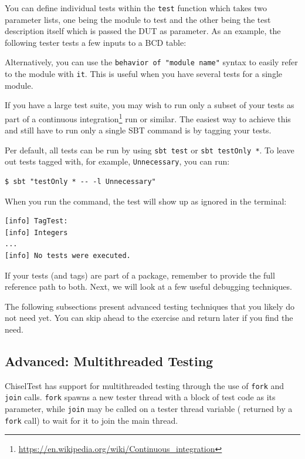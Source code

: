 \documentclass[%
    10pt,
    headinclude, footexclude,
    openright, %
    notitlepage,
    cleardoubleempty,
    headsepline,
    pointlessnumbers,
    bibtotoc, idxtotoc,
    ]{scrbook}
\newcommand{\code}[1]{{\small{\texttt{#1}}}}
\newcommand{\myref}[2]{\href{#1}{#2}}
\renewcommand{\myref}[2]{{#2}{\footnote{\url{#1}}}}
\begin{document}
You can define individual tests within the \code{test} function which takes two parameter 
lists, one being the module to test and the other being the test description itself which 
is passed the DUT as parameter. As an example, the following tester tests a few inputs to 
a BCD table:


\noindent Alternatively, you can use the \code{behavior of "module name"} syntax to easily 
refer to the module with \code{it}. This is useful when you have several tests for a 
single module.


\noindent If you have a large test suite, you may wish to run only a subset of your tests 
as part of a \myref{https://en.wikipedia.org/wiki/Continuous_integration}{continuous integration} 
run or similar. The easiest way to achieve this and still have to run only a single SBT command 
is by tagging your tests.


\noindent Per default, all tests can be run by using \code{sbt test} or \code{sbt testOnly *}. 
To leave out tests tagged with, for example, \code{Unnecessary}, you can run:

\begin{verbatim}
$ sbt "testOnly * -- -l Unnecessary"
\end{verbatim}

\noindent When you run the command, the test will show up as ignored in the terminal:

\begin{verbatim}
[info] TagTest:
[info] Integers
...
[info] No tests were executed.
\end{verbatim}

\noindent If your tests (and tags) are part of a package, remember to provide the full 
reference path to both. Next, we will look at a few useful debugging techniques.


The following subsections present advanced testing techniques that you likely do 
not need yet. You can skip ahead to the exercise and return later if you find the need.

\subsection{Advanced: Multithreaded Testing}

ChiselTest has support for multithreaded testing through the use of \code{fork} and 
\code{join} calls. \code{fork} spawns a new tester thread with a block of test code 
as its parameter, while \code{join} may be called on a tester thread variable (
returned by a \code{fork} call) to wait for it to join the main thread. 
\end{document}
